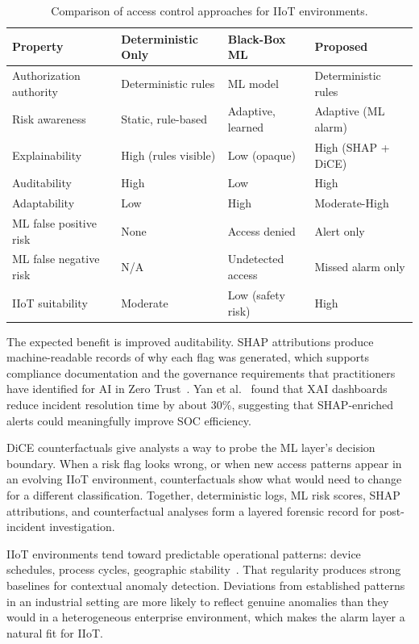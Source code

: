 \documentclass[conference]{IEEEtran}
\begin{document}
\begin{table}[t]
\centering
\caption{Comparison of access control approaches for IIoT environments.}
\label{tab:comparison}
\begin{tabular}{p{1.6cm}p{1.8cm}p{1.8cm}p{1.8cm}}
\toprule
\textbf{Property} & \textbf{Deterministic Only} & \textbf{Black-Box ML} & \textbf{Proposed} \\
\midrule
Authorization authority & Deterministic rules & ML model & Deterministic rules \\
\addlinespace
Risk awareness & Static, rule-based & Adaptive, learned & Adaptive (ML alarm) \\
\addlinespace
Explainability & High (rules visible) & Low (opaque) & High (SHAP + DiCE) \\
\addlinespace
Auditability & High & Low & High \\
\addlinespace
Adaptability & Low & High & Moderate-High \\
\addlinespace
ML false positive risk & None & Access denied & Alert only \\
\addlinespace
ML false negative risk & N/A & Undetected access & Missed alarm only \\
\addlinespace
IIoT suitability & Moderate & Low (safety risk) & High \\
\bottomrule
\end{tabular}
\end{table}

The expected benefit is improved auditability. SHAP attributions produce machine-readable records of why each flag was generated, which supports compliance documentation and the governance requirements that practitioners have identified for AI in Zero Trust~\cite{capuano2022, rastogi2025}. Yan et al.~\cite{yan2022} found that XAI dashboards reduce incident resolution time by about 30\%, suggesting that SHAP-enriched alerts could meaningfully improve SOC efficiency.

DiCE counterfactuals give analysts a way to probe the ML layer's decision boundary. When a risk flag looks wrong, or when new access patterns appear in an evolving IIoT environment, counterfactuals show what would need to change for a different classification. Together, deterministic logs, ML risk scores, SHAP attributions, and counterfactual analyses form a layered forensic record for post-incident investigation.

IIoT environments tend toward predictable operational patterns: device schedules, process cycles, geographic stability~\cite{zanasi2024, feng2023}. That regularity produces strong baselines for contextual anomaly detection. Deviations from established patterns in an industrial setting are more likely to reflect genuine anomalies than they would in a heterogeneous enterprise environment, which makes the alarm layer a natural fit for IIoT.
\end{document}
